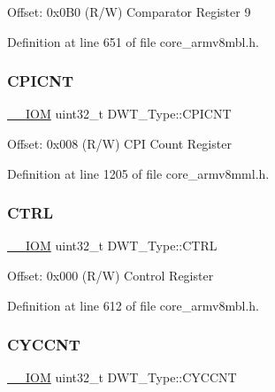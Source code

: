 Offset\+: 0x0\+B0 (R/W) Comparator Register 9 

Definition at line 651 of file core\+\_\+armv8mbl.\+h.

\mbox{\label{struct_d_w_t___type_a2c08096c82abe245c0fa97badc458154}} 
\subsubsection{\texorpdfstring{C\+P\+I\+C\+NT}{CPICNT}}
{\footnotesize\ttfamily \hyperlink{core__sc300_8h_ab6caba5853a60a17e8e04499b52bf691}{\+\_\+\+\_\+\+I\+OM} uint32\+\_\+t D\+W\+T\+\_\+\+Type\+::\+C\+P\+I\+C\+NT}

Offset\+: 0x008 (R/W) C\+PI Count Register 

Definition at line 1205 of file core\+\_\+armv8mml.\+h.

\mbox{\label{struct_d_w_t___type_add790c53410023b3b581919bb681fe2a}} 
\subsubsection{\texorpdfstring{C\+T\+RL}{CTRL}}
{\footnotesize\ttfamily \hyperlink{core__sc300_8h_ab6caba5853a60a17e8e04499b52bf691}{\+\_\+\+\_\+\+I\+OM} uint32\+\_\+t D\+W\+T\+\_\+\+Type\+::\+C\+T\+RL}

Offset\+: 0x000 (R/W) Control Register 

Definition at line 612 of file core\+\_\+armv8mbl.\+h.

\mbox{\label{struct_d_w_t___type_a102eaa529d9098242851cb57c52b42d9}} 
\subsubsection{\texorpdfstring{C\+Y\+C\+C\+NT}{CYCCNT}}
{\footnotesize\ttfamily \hyperlink{core__sc300_8h_ab6caba5853a60a17e8e04499b52bf691}{\+\_\+\+\_\+\+I\+OM} uint32\+\_\+t D\+W\+T\+\_\+\+Type\+::\+C\+Y\+C\+C\+NT}

